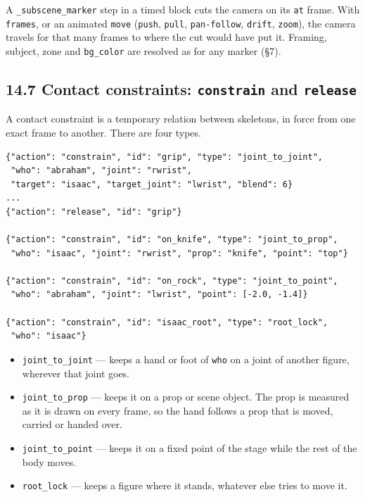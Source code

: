 \documentclass[
  12pt,
  letterpaper,
]{book}
\providecommand{\tightlist}{%
  \setlength{\itemsep}{0pt}\setlength{\parskip}{0pt}}
\begin{document}
A \texttt{\_subscene\_marker} step in a timed block cuts the camera on
its \texttt{at} frame. With \texttt{frames}, or an animated
\texttt{move} (\texttt{push}, \texttt{pull}, \texttt{pan-follow},
\texttt{drift}, \texttt{zoom}), the camera travels for that many frames
to where the cut would have put it. Framing, subject, zone and
\texttt{bg\_color} are resolved as for any marker (\S7).

\subsection{\texorpdfstring{14.7 Contact constraints: \texttt{constrain} and \texttt{release}}{14.7 Contact constraints: constrain and release}}\label{contact-constraints}

A contact constraint is a temporary relation between skeletons, in
force from one exact frame to another. There are four types.

\begin{verbatim}
{"action": "constrain", "id": "grip", "type": "joint_to_joint",
 "who": "abraham", "joint": "rwrist",
 "target": "isaac", "target_joint": "lwrist", "blend": 6}
...
{"action": "release", "id": "grip"}

{"action": "constrain", "id": "on_knife", "type": "joint_to_prop",
 "who": "isaac", "joint": "rwrist", "prop": "knife", "point": "top"}

{"action": "constrain", "id": "on_rock", "type": "joint_to_point",
 "who": "abraham", "joint": "lwrist", "point": [-2.0, -1.4]}

{"action": "constrain", "id": "isaac_root", "type": "root_lock",
 "who": "isaac"}
\end{verbatim}

\begin{itemize}
\tightlist
\item
  \texttt{joint\_to\_joint}
  --- keeps a hand or foot of \texttt{who} on a joint of another
  figure, wherever that joint goes.
\item
  \texttt{joint\_to\_prop}
  --- keeps it on a prop or scene object. The prop is measured as it is
  drawn on every frame, so the hand follows a prop that is moved,
  carried or handed over.
\item
  \texttt{joint\_to\_point}
  --- keeps it on a fixed point of the stage while the rest of the body
  moves.
\item
  \texttt{root\_lock} --- keeps a
  figure where it stands, whatever else tries to move it.
\end{itemize}
\end{document}

